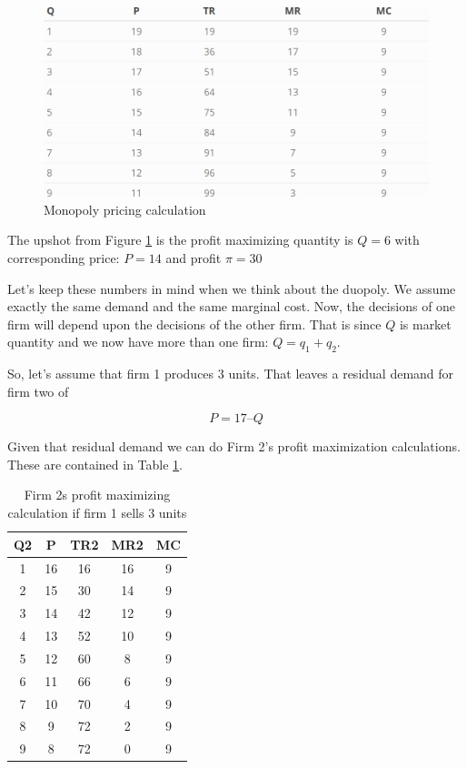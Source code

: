 \documentclass[
]{book}
\begin{document}
\begin{figure}

{\centering \includegraphics[width=0.8\linewidth]{img/oligopoly/gentable2} 

}

\caption{Monopoly pricing calculation}\label{fig:oligopoly2}
\end{figure}

The upshot from Figure \ref{fig:oligopoly2} is the profit maximizing quantity is \(Q = 6\) with corresponding price: \(P=14\) and profit \(\pi=30\)

Let's keep these numbers in mind when we think about the duopoly. We assume exactly the same demand and the same marginal cost. Now, the decisions of one firm will depend upon the decisions of the other firm. That is since \(Q\) is market quantity and we now have more than one firm: \(Q=q_1+q_2\).

So, let's assume that firm 1 produces 3 units. That leaves a residual demand for firm two of

\[P = 17 – Q\]

Given that residual demand we can do Firm 2's profit maximization calculations. These are contained in Table \ref{tab:oligopoly03}.

\begin{table}

\caption{\label{tab:oligopoly03}Firm 2s profit maximizing calculation if firm 1 sells 3 units}
\centering
\begin{tabular}[t]{c|c|c|c|c}
\hline
Q2 & P & TR2 & MR2 & MC\\
\hline
1 & 16 & 16 & 16 & 9\\
\hline
2 & 15 & 30 & 14 & 9\\
\hline
3 & 14 & 42 & 12 & 9\\
\hline
4 & 13 & 52 & 10 & 9\\
\hline
5 & 12 & 60 & 8 & 9\\
\hline
6 & 11 & 66 & 6 & 9\\
\hline
7 & 10 & 70 & 4 & 9\\
\hline
8 & 9 & 72 & 2 & 9\\
\hline
9 & 8 & 72 & 0 & 9\\
\hline
\end{tabular}
\end{table}
\end{document}
